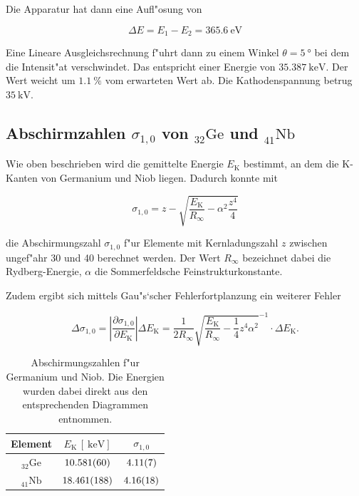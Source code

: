 		Die Apparatur hat dann eine Aufl"osung von

		\begin{equation}
			\Delta E = E_1 - E_2 = \SI{365.6}{\electronvolt} \nonumber
		\end{equation}

		Eine Lineare Ausgleichsrechnung f"uhrt dann zu einem Winkel $\theta = \SI{5}{\degree}$ bei dem die Intensit"at verschwindet.
		Das entspricht einer Energie von $\SI{35.387}{\kilo \electronvolt}$. Der Wert weicht um $\SI{1.1}{\percent}$ vom erwarteten Wert ab. Die Kathodenspannung betrug $\SI{35}{\kilo \volt}$.

	\subsection{Abschirmzahlen $\sigma_{1,0}$ von ${}_{32}^{}\mathrm{Ge}$ und ${}_{41}^{}\mathrm{Nb}$}
		\label{subsec:abschirm1}
		Wie oben beschrieben wird die gemittelte Energie $E_\mathrm{K}$ bestimmt, an dem die K-Kanten von Germanium und Niob liegen. 
		Dadurch konnte mit 

		\begin{equation}
			\sigma_{1,0} = z - \sqrt{\frac{E_\mathrm{K}}{R_\infty} - \alpha^2 \frac{z^4}{4}} \nonumber
		\end{equation}

		die Abschirmungszahl $\sigma_{1,0}$ f"ur Elemente mit Kernladungszahl $z$ zwischen ungef"ahr 30 und 40 berechnet werden.
		Der Wert $R_\infty$ bezeichnet dabei die Rydberg-Energie, $\alpha$ die Sommerfeldsche Feinstrukturkonstante.

		Zudem ergibt sich mittels Gau"s`scher Fehlerfortplanzung ein weiterer Fehler

		\begin{equation}
			\Delta \sigma_{1,0} = \left| \frac{\partial \sigma_{1,0}}{\partial E_\mathrm{K}} \right| \Delta E_\mathrm{K} =
			\frac{1}{2 R_{\infty}} \sqrt{\frac{E_\mathrm{K}}{R_\infty} - \frac{1}{4} z^4 \alpha^2}^{-1}
			\cdot \Delta E_\mathrm{K} . \nonumber
		\end{equation}

		\begin{table}[h!]
			\centering
			\begin{tabular}{|c|c|c|}
				\caption{Abschirmungszahlen f"ur Germanium und Niob. Die Energien wurden dabei direkt aus den entsprechenden Diagrammen entnommen.}
				\hline
				Element & 
				$E_\mathrm{K}\,[\SI{}{\kilo \electronvolt}]$ & 
				$\sigma_{1,0}$ \\
				\hline \hline
				${}_{32}^{}\mathrm{Ge}$ & $\SI{10.581 (60)}{}$ & $\SI{4.11 (7)}{}$ \\
				${}_{41}^{}\mathrm{Nb}$ & $\SI{18.461 (188)}{}$ & $\SI{4.16 (18)}{}$ \\
				\hline
			\end{tabular}
		\end{table}

